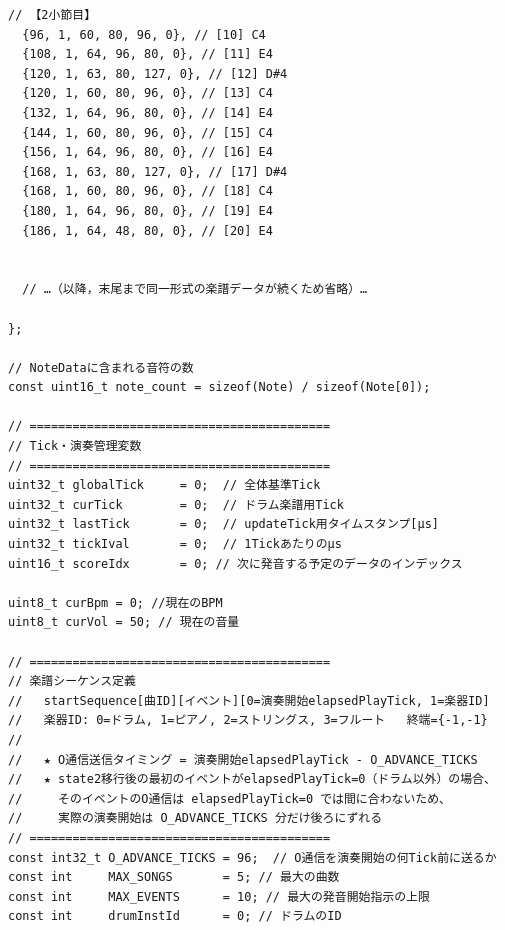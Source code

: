 \begin{lstlisting}[caption={drum\_0706.ino（楽譜データは冒頭2小節のみ掲載）}, label={lst:douki_drum_full}]
  // 【2小節目】
  {96, 1, 60, 80, 96, 0}, // [10] C4
  {108, 1, 64, 96, 80, 0}, // [11] E4
  {120, 1, 63, 80, 127, 0}, // [12] D#4
  {120, 1, 60, 80, 96, 0}, // [13] C4
  {132, 1, 64, 96, 80, 0}, // [14] E4
  {144, 1, 60, 80, 96, 0}, // [15] C4
  {156, 1, 64, 96, 80, 0}, // [16] E4
  {168, 1, 63, 80, 127, 0}, // [17] D#4
  {168, 1, 60, 80, 96, 0}, // [18] C4
  {180, 1, 64, 96, 80, 0}, // [19] E4
  {186, 1, 64, 48, 80, 0}, // [20] E4


  // …（以降，末尾まで同一形式の楽譜データが続くため省略）…

};

// NoteDataに含まれる音符の数
const uint16_t note_count = sizeof(Note) / sizeof(Note[0]);

// ==========================================
// Tick・演奏管理変数
// ==========================================
uint32_t globalTick     = 0;  // 全体基準Tick
uint32_t curTick        = 0;  // ドラム楽譜用Tick
uint32_t lastTick       = 0;  // updateTick用タイムスタンプ[µs]
uint32_t tickIval       = 0;  // 1Tickあたりのµs
uint16_t scoreIdx       = 0; // 次に発音する予定のデータのインデックス

uint8_t curBpm = 0; //現在のBPM
uint8_t curVol = 50; // 現在の音量

// ==========================================
// 楽譜シーケンス定義
//   startSequence[曲ID][イベント][0=演奏開始elapsedPlayTick, 1=楽器ID]
//   楽器ID: 0=ドラム, 1=ピアノ, 2=ストリングス, 3=フルート   終端={-1,-1}
//
//   ★ O通信送信タイミング = 演奏開始elapsedPlayTick - O_ADVANCE_TICKS
//   ★ state2移行後の最初のイベントがelapsedPlayTick=0（ドラム以外）の場合、
//     そのイベントのO通信は elapsedPlayTick=0 では間に合わないため、
//     実際の演奏開始は O_ADVANCE_TICKS 分だけ後ろにずれる
// ==========================================
const int32_t O_ADVANCE_TICKS = 96;  // O通信を演奏開始の何Tick前に送るか
const int     MAX_SONGS       = 5; // 最大の曲数
const int     MAX_EVENTS      = 10; // 最大の発音開始指示の上限
const int     drumInstId      = 0; // ドラムのID


\end{lstlisting}
